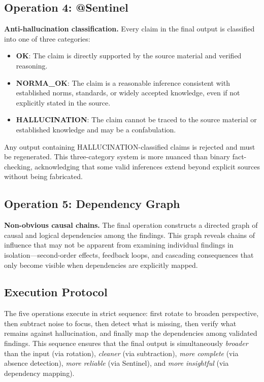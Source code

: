 \documentclass[11pt,a4paper]{article}
\begin{document}
\subsection{Operation 4: @Sentinel}

\textbf{Anti-hallucination classification.} Every claim in the final output is classified into one of three categories:

\begin{itemize}
    \item \textbf{OK}: The claim is directly supported by the source material and verified reasoning.
    \item \textbf{NORMA\_OK}: The claim is a reasonable inference consistent with established norms, standards, or widely accepted knowledge, even if not explicitly stated in the source.
    \item \textbf{HALLUCINATION}: The claim cannot be traced to the source material or established knowledge and may be a confabulation.
\end{itemize}

Any output containing HALLUCINATION-classified claims is rejected and must be regenerated. This three-category system is more nuanced than binary fact-checking, acknowledging that some valid inferences extend beyond explicit sources without being fabricated.

\subsection{Operation 5: Dependency Graph}

\textbf{Non-obvious causal chains.} The final operation constructs a directed graph of causal and logical dependencies among the findings. This graph reveals chains of influence that may not be apparent from examining individual findings in isolation---second-order effects, feedback loops, and cascading consequences that only become visible when dependencies are explicitly mapped.

\subsection{Execution Protocol}

The five operations execute in strict sequence: first rotate to broaden perspective, then subtract noise to focus, then detect what is missing, then verify what remains against hallucination, and finally map the dependencies among validated findings. This sequence ensures that the final output is simultaneously \emph{broader} than the input (via rotation), \emph{cleaner} (via subtraction), \emph{more complete} (via absence detection), \emph{more reliable} (via Sentinel), and \emph{more insightful} (via dependency mapping).
\end{document}
